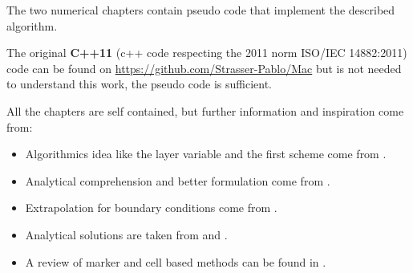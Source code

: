 \documentclass[a4paper]{master}
\begin{document}
The two numerical chapters contain pseudo code that implement the described algorithm.

The original \textbf{C++11} (c++ code respecting the 2011 norm ISO/IEC 14882:2011) code can be found on \url{https://github.com/Strasser-Pablo/Mac}
but is not needed to understand this work, the pseudo code is sufficient.

All the chapters are self contained,
but further information and inspiration come from:
\begin{itemize}
 \item Algorithmics idea like the layer variable and the first scheme come from \cite{fluidforrestofus}.
 \item Analytical comprehension and better formulation come from \cite{citeulike:11163809}.
 \item Extrapolation for boundary conditions come from \cite{FLD:FLD148}.
 \item Analytical solutions are taken from \cite{Batchelor} and \cite{Kampanis:2006:SGH:1148052.1148065}.
 \item A review of marker and cell based methods can be found in \cite{citeulike:3055787}.
\end{itemize}









\nocite{*}

\end{document}
